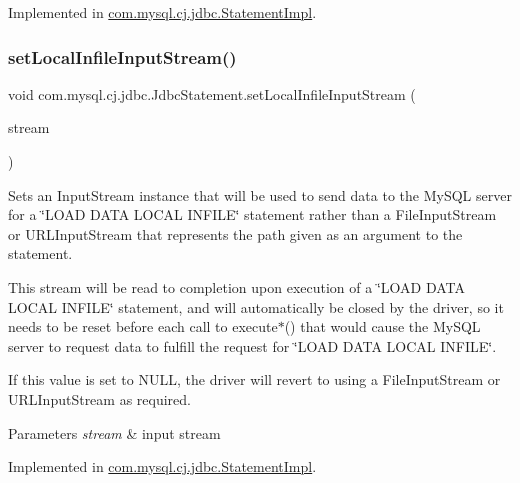 Implemented in \mbox{\hyperlink{classcom_1_1mysql_1_1cj_1_1jdbc_1_1_statement_impl_a903fdf158910d8f86a7417699ac93064}{com.\+mysql.\+cj.\+jdbc.\+Statement\+Impl}}.

\mbox{\label{interfacecom_1_1mysql_1_1cj_1_1jdbc_1_1_jdbc_statement_a89093285d02aa790bb07c7afab7c4140}} 
\subsubsection{\texorpdfstring{set\+Local\+Infile\+Input\+Stream()}{setLocalInfileInputStream()}}
{\footnotesize\ttfamily void com.\+mysql.\+cj.\+jdbc.\+Jdbc\+Statement.\+set\+Local\+Infile\+Input\+Stream (\begin{DoxyParamCaption}\item[{Input\+Stream}]{stream }\end{DoxyParamCaption})}

Sets an Input\+Stream instance that will be used to send data to the My\+S\+QL server for a \char`\"{}\+L\+O\+A\+D D\+A\+T\+A L\+O\+C\+A\+L I\+N\+F\+I\+L\+E\char`\"{} statement rather than a File\+Input\+Stream or U\+R\+L\+Input\+Stream that represents the path given as an argument to the statement.

This stream will be read to completion upon execution of a \char`\"{}\+L\+O\+A\+D D\+A\+T\+A L\+O\+C\+A\+L I\+N\+F\+I\+L\+E\char`\"{} statement, and will automatically be closed by the driver, so it needs to be reset before each call to execute$\ast$() that would cause the My\+S\+QL server to request data to fulfill the request for \char`\"{}\+L\+O\+A\+D D\+A\+T\+A L\+O\+C\+A\+L I\+N\+F\+I\+L\+E\char`\"{}.

If this value is set to N\+U\+LL, the driver will revert to using a File\+Input\+Stream or U\+R\+L\+Input\+Stream as required.


\begin{DoxyParams}{Parameters}
{\em stream} & input stream \\
\hline
\end{DoxyParams}


Implemented in \mbox{\hyperlink{classcom_1_1mysql_1_1cj_1_1jdbc_1_1_statement_impl_a398ed93fc7171fac680cd867a87cbf23}{com.\+mysql.\+cj.\+jdbc.\+Statement\+Impl}}.


